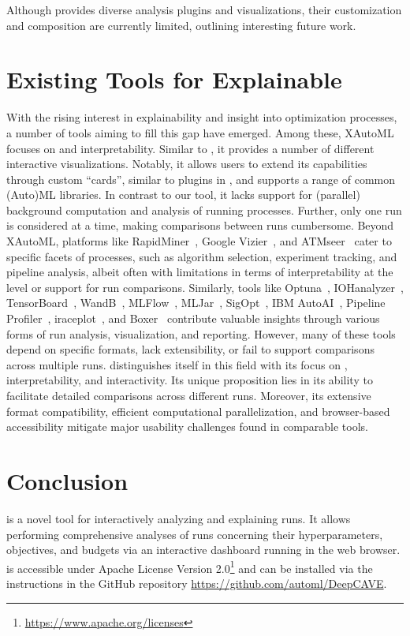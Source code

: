 \documentclass[twoside,11pt]{article}
\begin{document}
Although \Deepcave provides diverse analysis plugins and visualizations, their customization and composition are currently limited, outlining interesting future work.

\section{Existing Tools for Explainable \AutoML}
With the rising interest in explainability and insight into optimization processes, a number of tools aiming to fill this gap have emerged. 
Among these, XAutoML~\citep{zoller-acm23a} focuses on \AutoML and interpretability. 
Similar to \Deepcave, it provides a number of different interactive visualizations.
Notably, it allows users to extend its capabilities through custom ``cards'', similar to plugins in \Deepcave, and supports a range of common (Auto)ML libraries. 
In contrast to our tool, it lacks support for (parallel) background computation and analysis of running \HPO processes.
Further, only one \HPO run is considered at a time, making comparisons between runs cumbersome. %
Beyond XAutoML, platforms like RapidMiner~\citep{altair}, Google Vizier~\citep{golovin-kdd17a}, and ATMseer~\citep{wang-chi18a} cater to specific facets of \AutoML processes, such as algorithm selection, experiment tracking, and pipeline analysis, albeit often with limitations in terms of interpretability at the \HPO level or support for run comparisons. 
Similarly, tools like Optuna~\citep{akiba-ickddm19a}, IOHanalyzer~\citep{wang-acm22a}, TensorBoard~\citep{abadi-15a}, WandB~\citep{biewald-wandb20a}, MLFlow~\citep{chen-deem20a}, MLJar~\citep{plonska-21a}, SigOpt~\citep{clark-19a}, IBM AutoAI~\citep{wang-iui20ab}, Pipeline Profiler~\citep{ono-ieee21a}, iraceplot~\citep{lopezibanez-github25}, and Boxer~\citep{gleicher-cgf20a} contribute valuable insights through various forms of run analysis, visualization, and reporting. 
However, many of these tools depend on specific formats, lack extensibility, or fail to support comparisons across multiple \HPO runs.
\Deepcave distinguishes itself in this field with its focus on \HPO, interpretability, and interactivity. 
Its unique proposition lies in its ability to facilitate detailed comparisons across different \HPO runs.
Moreover, its extensive format compatibility, efficient computational parallelization, and browser-based accessibility mitigate major usability challenges found in comparable tools.

\section{Conclusion}
\Deepcave is a novel tool for interactively analyzing and explaining \HPO runs. 
It allows performing comprehensive analyses of \HPO runs concerning their hyperparameters, objectives, and budgets via an interactive dashboard running in the web browser.
\Deepcave is accessible under Apache License Version 2.0\footnote{\url{https://www.apache.org/licenses}} and can be installed via the instructions in the GitHub repository \url{https://github.com/automl/DeepCAVE}.
\end{document}
